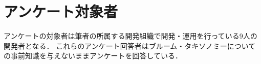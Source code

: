 \section{アンケート対象者}
アンケートの対象者は筆者の所属する開発組織で開発・運用を行っている9人の開発者となる．
これらのアンケート回答者はブルーム・タキソノミーについての事前知識を与えないままアンケートを回答している．
